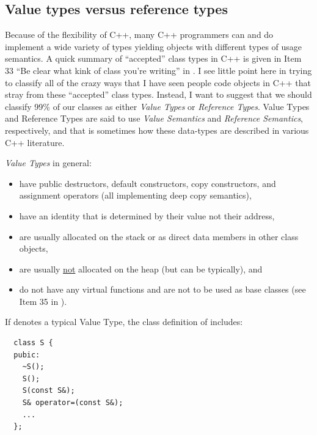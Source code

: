 \documentclass[pdf,ps2pdf,11pt]{SANDreport}
\begin{document}
%
{}\subsection{Value types versus reference types}
\label{sec:value-and-reference-types}
%

Because of the flexibility of C++, many C++ programmers can and do
implement a wide variety of types yielding objects with different types
of usage semantics.  A quick summary of ``accepted'' class types in
C++ is given in Item 33 ``Be clear what kink of class you're writing''
in {}\cite{C++CodingStandards05}.  I see little point here in trying
to classify all of the crazy ways that I have seen people code objects
in C++ that stray from these ``accepted'' class types.  Instead, I
want to suggest that we should classify 99\% of our classes as either
{}\textit{Value Types} or {}\textit{Reference Types}.  Value Types and
Reference Types are said to use {}\textit{Value Semantics} and
{}\textit{Reference Semantics}, respectively, and that is sometimes
how these data-types are described in various C++ literature.

{}\textit{Value Types} in general:

\begin{itemize}

{}\item have public destructors, default constructors, copy
constructors, and assignment operators (all implementing deep copy
semantics),

{}\item have an identity that is determined by their value not their
address,

{}\item are usually allocated on the stack or as direct data members
in other class objects,

{}\item are usually {}\underline{not} allocated on the heap (but can
be typically), and

{}\item do not have any virtual functions and are not to be used as
base classes (see Item 35 in {}\cite{C++CodingStandards05}).

\end{itemize}

If {} denotes a typical Value Type, the class definition of
{} includes:

{\small\begin{verbatim}
  class S {
  pubic:
    ~S();
    S();
    S(const S&);
    S& operator=(const S&);
    ...
  };
\end{verbatim}}
\end{document}
